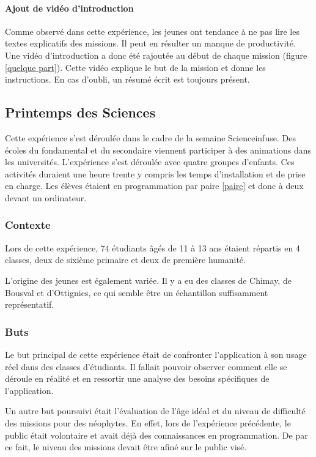 \paragraph{Ajout de vidéo d'introduction}
Comme observé dans cette expérience, les jeunes ont tendance à ne pas lire les textes explicatifs des missions. Il peut en résulter un manque de productivité. Une vidéo d'introduction a donc été rajoutée au début de chaque mission (figure \ref{quelque part}). Cette vidéo explique le but de la mission et donne les instructions. En cas d'oubli, un résumé écrit est toujours présent.

\subsection{Printemps des Sciences}
Cette expérience s'est déroulée dans le cadre de la semaine Scienceinfuse. Des écoles du fondamental et du secondaire viennent participer à des animations dans les universités. L'expérience s'est déroulée avec quatre groupes d'enfants. Ces activités duraient une heure trente y compris les temps d'installation et de prise en charge. Les élèves étaient en programmation par paire \ref{paire} et donc à deux devant un ordinateur.

\subsubsection{Contexte}
Lors de cette expérience, 74 étudiants âgés de 11 à 13 ans étaient répartis en 4 classes, deux de sixième primaire et deux de première humanité.

L'origine des jeunes est également variée. Il y a eu des classes de Chimay, de Bousval et d'Ottignies, ce qui semble être un échantillon suffisamment représentatif.

\subsubsection{Buts}
Le but principal de cette expérience était de confronter l'application à son usage réel dans des classes d'étudiants. Il fallait pouvoir observer comment elle se déroule en réalité et en ressortir une analyse des besoins spécifiques de l'application.

Un autre but poursuivi était l'évaluation de l'âge idéal et du niveau de difficulté des missions pour des néophytes. En effet, lors de l'expérience précédente, le public était volontaire et avait déjà des connaissances en programmation. De par ce fait, le niveau des missions devait être afiné sur le public visé.

